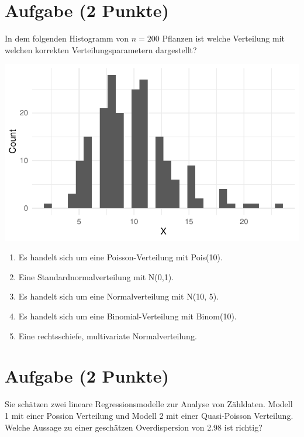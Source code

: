 \documentclass[a4paper, 10pt]{scrartcl}\usepackage[]{graphicx}\usepackage[]{xcolor}
\makeatletter
\def\maxwidth{ %
  \ifdim\Gin@nat@width>\linewidth
    \linewidth
  \else
    \Gin@nat@width
  \fi
}
\makeatother
\begin{document}
\section{Aufgabe \hfill (2 Punkte)}

In dem folgenden Histogramm von $n = 200$ Pflanzen ist welche Verteilung
mit welchen korrekten Verteilungsparametern dargestellt?



{\centering \includegraphics[width=\maxwidth]{img/mc-distribution-02-a-1} 

}







\begin{enumerate}
\item [\textbf{A} \msquare] Es handelt sich um eine Poisson-Verteilung mit Pois(10).
\item [\textbf{B} \msquare] Eine Standardnormalverteilung mit N(0,1).
\item [\textbf{C} \msquare] Es handelt sich um eine Normalverteilung mit N(10, 5).
\item [\textbf{D} \msquare] Es handelt sich um eine Binomial-Verteilung mit Binom(10).
\item [\textbf{E} \msquare] Eine rechtsschiefe, multivariate Normalverteilung.
\end{enumerate} 

\section{Aufgabe \hfill (2 Punkte)}



Sie sch{\"a}tzen zwei lineare Regressionsmodelle zur Analyse von
Z{\"a}hldaten. Modell 1 mit einer Possion Verteilung und Modell 2 mit einer
Quasi-Poisson Verteilung. Welche Aussage zu einer gesch{\"a}tzen Overdispersion
von 2.98 ist richtig?
\end{document}
